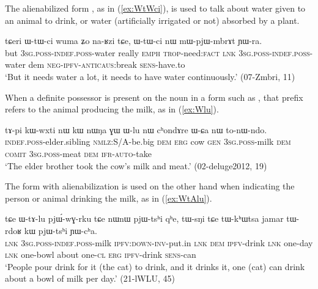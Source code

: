 The alienabilized form , as in (\ref{ex:WtWci}), is used to talk about water given to an animal to drink, or water (artificially irrigated or not) absorbed by a plant.

 \begin{exe}
\ex \label{ex:WtWci}
 \gll  tɕeri ɯ-tɯ-ci wuma ʑo na-ʁzi tɕe, ɯ-tɯ-ci nɯ mɯ-pjɯ-mbrɤt ɲɯ-ra. \\
 but \textsc{3sg.poss}-\textsc{indef.poss}-water really \textsc{emph} \textsc{trop}-need:\textsc{fact} \textsc{lnk} \textsc{3sg.poss}-\textsc{indef.poss}-water dem \textsc{neg-ipfv-anticaus}:break \textsc{sens}-have.to \\
 \glt  `But it needs water a lot, it needs to have water continuously.'  (07-Zmbri, 11)
 \end{exe}
 
 When a definite possessor is present on the noun  in a form such as , that prefix refers to the animal producing the milk, as in (\ref{ex:Wlu}).
 
 \begin{exe}
\ex \label{ex:Wlu}
 \gll 
tɤ-pi kɯ-wxti nɯ kɯ nɯŋa ɣɯ ɯ-lu nɯ cʰondɤre  ɯ-ɕa nɯ to-nɯ-ndo. \\
\textsc{indef.poss}-elder.sibling \textsc{nmlz}:S/A-be.big \textsc{dem} \textsc{erg} cow \textsc{gen} \textsc{3sg.poss}-milk \textsc{dem} \textsc{comit} \textsc{3sg.poss}-meat \textsc{dem} \textsc{ifr}-\textsc{auto}-take \\
\glt `The elder brother took the cow's milk and meat.' (02-deluge2012, 19)
 \end{exe}

The form  with alienabilization is used on the other hand when indicating the person or animal drinking the milk, as in (\ref{ex:WtAlu}).

  \begin{exe}
\ex \label{ex:WtAlu}
 \gll tɕe ɯ-tɤ-lu pjɯ́-wɣ-rku tɕe nɯnɯ pjɯ-tsʰi qʰe, tɯ-sŋi tɕe tɯ-kʰɯtsa jamar tɯ-rdoʁ kɯ pjɯ-tsʰi ɲɯ-cʰa. \\
\textsc{lnk} \textsc{3sg.poss}-\textsc{indef.poss}-milk \textsc{ipfv}:\textsc{down}-\textsc{inv}-put.in  \textsc{lnk} \textsc{dem} \textsc{ipfv}-drink \textsc{lnk} one-day \textsc{lnk} one-bowl about one-\textsc{cl} \textsc{erg} \textsc{ipfv}-drink \textsc{sens}-can \\
\glt `People pour drink for it (the cat) to drink, and it drinks it, one (cat) can drink about a bowl of milk per day.' (21-lWLU, 45)
  \end{exe}

